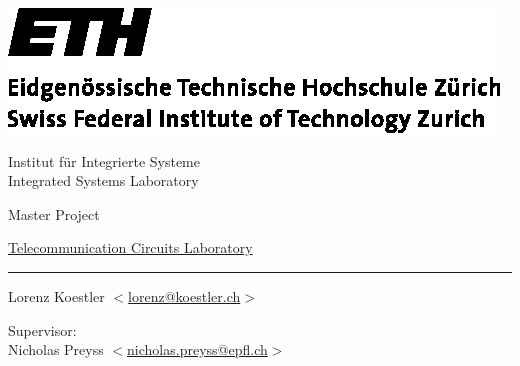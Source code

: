 \begin{center}

  \vspace*{-2cm}
  \begin{minipage}{\textwidth}
    \begin{minipage}{68mm}
      \includegraphics{ethlogo}
    \end{minipage} \hfill
    \begin{minipage}{50mm}
      \vspace{8.7mm}
      \begin{flushright}
         {\footnotesize Institut f\" ur Integrierte Systeme\\
          \vspace{-0.75mm} Integrated Systems Laboratory}
      \end{flushright}
    \end{minipage}
  \end{minipage}

  \vspace{3cm}

  \begin{flushright}
    {\LARGE Master Project}\\
    \vspace{5mm}

    \href{http://tcl.epfl.ch}{Telecommunication Circuits Laboratory}


    \vspace{1.5cm} {\LARGE \bfseries \mytitle}
    \rule{\textwidth}{0.8mm}

    \vspace{2cm}

    Lorenz Koestler $ < $\href{mailto:lorenz@koestler.ch}{lorenz@koestler.ch}$ > $ \\

    \vspace{4cm}

    \myterm

    \vspace{2cm}
    Supervisor: \\
    Nicholas Preyss $ < $\href{mailto:nicholas.preyss@epfl.ch}{nicholas.preyss@epfl.ch}$ > $ \\

  \end{flushright}
\end{center}
\newpage
